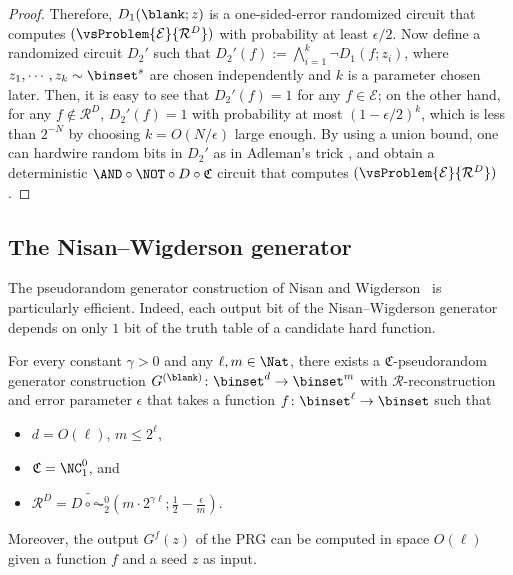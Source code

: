 \documentclass{toc}
\begin{document}
\begin{proof}
  Therefore, $D_1(\blank; z)$ is a one-sided-error randomized circuit that computes $(\vsProblem{\mathcal{E}}{\mathcal{R}^D})$
  with probability at least $\epsilon / 2$.
  Now define a randomized circuit $D_2'$ such that $D_2'(f) := \bigwedge_{i = 1}^k \neg D_1(f; z_i)$,
  where $z_1, \cdots, z_k \sim \binset^s$ are chosen independently and $k$ is a parameter chosen later.
  Then, it is easy to see that $D_2'(f) = 1$ for any $f \in \mathcal{E}$; on the other hand, for any $f \not\in \mathcal{R}^D$,
  $D_2'(f) = 1$ with probability at most $(1 - \epsilon / 2)^k$, which is less than $2^{-N}$ by choosing $k = O(N / \epsilon)$ large enough.
  By using a union bound, one can hardwire random bits in $D_2'$ as in Adleman's trick \cite{Adleman78_focs_conf},
  and obtain a deterministic $\AND \circ \NOT \circ D \circ \mathfrak{C}$ circuit that computes $(\vsProblem{\mathcal{E}}{\mathcal{R}^D})$.
\end{proof}




\subsection{The Nisan--Wigderson generator}
\label{subsection_ReviewNWGenerator}
The pseudorandom generator construction of Nisan and Wigderson~\cite{NisanW94_jcss_journals} is particularly efficient.
Indeed, each output bit of the Nisan--Wigderson generator
depends on only $1$ bit of the truth table of a candidate hard function.

\begin{theorem}
  \label{thm_NWGenerator}
  For every constant $\gamma > 0$ and any $\ell, m \in \Nat$,
  there exists a $\mathfrak{C}$-pseudorandom generator construction $G^{(\blank)} \colon \binset^d \to \binset^m$
  with $\mathcal{R}$-reconstruction and error parameter $\epsilon$
  that takes a function $f \colon \binset^\ell \to \binset$
  such that
  \begin{itemize}
    \item
          $d = O(\ell)$, $m \le 2^\ell$,
    \item
          $\mathfrak{C} = \NC^0_1$, and
    \item
          $\mathcal{R}^D = \widetilde{D \circ \AC^0_2}(m \cdot 2^{\gamma \ell}; \frac{1}{2} - \frac{\epsilon}{m})$.
  \end{itemize}
  Moreover, the output $G^{f}(z)$ of the PRG
  can be computed in space $O(\ell)$
  given a function $f$ and a seed $z$ as input.
\end{theorem}
\end{document}
